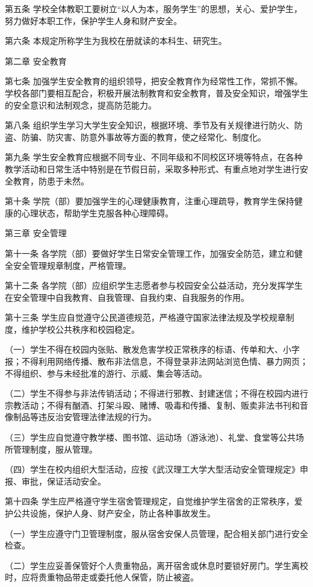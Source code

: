 \documentclass[UTF8,12pt,a4paper]{report}
\begin{document}
第五条 学校全体教职工要树立“以人为本，服务学生”的思想，关心、爱护学生，努力做好本职工作，保护学生人身和财产安全。

第六条 本规定所称学生为我校在册就读的本科生、研究生。

第二章 安全教育

第七条 加强学生安全教育的组织领导，把安全教育作为经常性工作，常抓不懈。学校各部门要相互配合，积极开展法制教育和安全教育，普及安全知识，增强学生的安全意识和法制观念，提高防范能力。

第八条 组织学生学习大学生安全知识，根据环境、季节及有关规律进行防火、防盗、防骗、防灾害、防意外事故等方面的教育，使之经常化、制度化。

第九条 学生安全教育应根据不同专业、不同年级和不同校区环境等特点，在各种教学活动和日常生活中特别是在节假日前，采取多种形式、有重点地对学生进行安全教育，防患于未然。

第十条 学院（部）要加强学生的心理健康教育，注重心理疏导，教育学生保持健康的心理状态，帮助学生克服各种心理障碍。

第三章 安全管理

第十一条 各学院（部）要做好学生日常安全管理工作，加强安全防范，建立和健全安全管理规章制度，严格管理。

第十二条 各学院（部）应组织学生志愿者参与校园安全公益活动，充分发挥学生在安全管理中自我教育、自我管理、自我约束、自我服务的作用。

第十三条 学生应自觉遵守公民道德规范，严格遵守国家法律法规及学校规章制度，维护学校公共秩序和校园稳定。

（一）学生不得在校园内张贴、散发危害学校正常秩序的标语、传单和大、小字报；不得利用网络传播、散布非法信息，不得登录非法网站浏览色情、暴力网页；不得组织、参与未经批准的游行、示威、集会等活动。

（二）学生不得参与非法传销活动；不得进行邪教、封建迷信；不得在校园内进行宗教活动；不得有酗酒、打架斗殴、赌博、吸毒和传播、复制、贩卖非法书刊和音像制品等违反治安管理法律法规的行为。

（三）学生应自觉遵守教学楼、图书馆、运动场（游泳池）、礼堂、食堂等公共场所管理制度，服从管理。

（四）学生在校内组织大型活动，应按《武汉理工大学大型活动安全管理规定》申报、审批，保证活动安全。

第十四条 学生应严格遵守学生宿舍管理规定，自觉维护学生宿舍的正常秩序，爱护公共设施，保护人身、财产安全，防止各种事故发生。

（一）学生应遵守门卫管理制度，服从宿舍安保人员管理，配合相关部门进行安全检查。

（二）学生应妥善保管好个人贵重物品，离开宿舍或休息时要锁好房门。学生离校时，应将贵重物品带走或委托他人保管，防止被盗。
\end{document}
